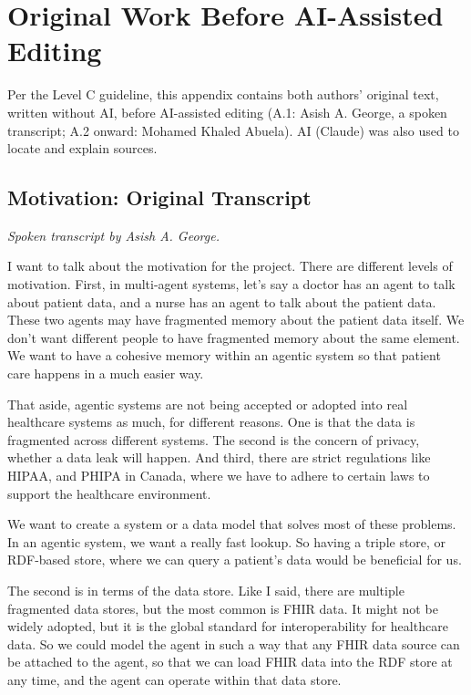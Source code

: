 \documentclass[sigconf]{acmart}
\begin{document}



\clearpage
\appendix
\section{Original Work Before AI-Assisted Editing}
Per the Level C guideline, this appendix contains both authors' original text, written without AI, before AI-assisted editing (A.1: Asish A. George, a spoken transcript; A.2 onward: Mohamed Khaled Abuela). AI (Claude) was also used to locate and explain sources.

\subsection{Motivation: Original Transcript}
\textit{Spoken transcript by Asish A. George.}

I want to talk about the motivation for the project. There are different levels of motivation. First, in multi-agent systems, let's say a doctor has an agent to talk about patient data, and a nurse has an agent to talk about the patient data. These two agents may have fragmented memory about the patient data itself. We don't want different people to have fragmented memory about the same element. We want to have a cohesive memory within an agentic system so that patient care happens in a much easier way.

That aside, agentic systems are not being accepted or adopted into real healthcare systems as much, for different reasons. One is that the data is fragmented across different systems. The second is the concern of privacy, whether a data leak will happen. And third, there are strict regulations like HIPAA, and PHIPA in Canada, where we have to adhere to certain laws to support the healthcare environment.

We want to create a system or a data model that solves most of these problems. In an agentic system, we want a really fast lookup. So having a triple store, or RDF-based store, where we can query a patient's data would be beneficial for us.

The second is in terms of the data store. Like I said, there are multiple fragmented data stores, but the most common is FHIR data. It might not be widely adopted, but it is the global standard for interoperability for healthcare data. So we could model the agent in such a way that any FHIR data source can be attached to the agent, so that we can load FHIR data into the RDF store at any time, and the agent can operate within that data store.
\end{document}
